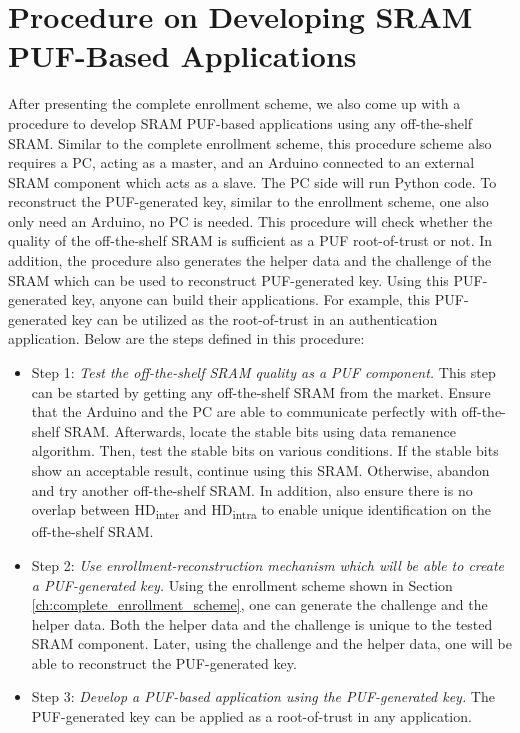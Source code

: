 \section{Procedure on Developing SRAM PUF-Based Applications}\label{ch:procedure_develop}
After presenting the complete enrollment scheme, we also come up with a procedure to develop SRAM PUF-based applications using any off-the-shelf SRAM.
Similar to the complete enrollment scheme, this procedure scheme also requires a PC, acting as a master, and an Arduino connected to an external SRAM component which acts as a slave. The PC side will run Python code. To reconstruct the PUF-generated key, similar to the enrollment scheme, one also only need an Arduino, no PC is needed.
This procedure will check whether the quality of the off-the-shelf SRAM is sufficient as a PUF root-of-trust or not. In addition, the procedure also generates the helper data and the challenge of the SRAM which can be used to reconstruct PUF-generated key. Using this PUF-generated key, anyone can build their applications. For example, this PUF-generated key can be utilized as the root-of-trust in an authentication application. Below are the steps defined in this procedure:
\begin{itemize}
  \item Step 1: \textit{Test the off-the-shelf SRAM quality as a PUF component.}\newline
  This step can be started by getting any off-the-shelf SRAM from the market. Ensure that the Arduino and the PC are able to communicate perfectly with off-the-shelf SRAM. Afterwards, locate the stable bits using data remanence algorithm. Then, test the stable bits on various conditions. If the stable bits show an acceptable result, continue using this SRAM. Otherwise, abandon and try another off-the-shelf SRAM. In addition, also ensure there is no overlap between HD\textsubscript{inter} and HD\textsubscript{intra} to enable unique identification on the off-the-shelf SRAM.
  \item Step 2: \textit{Use enrollment-reconstruction mechanism which will be able to create a PUF-generated key.}\newline
  Using the enrollment scheme shown in Section \ref{ch:complete_enrollment_scheme}, one can generate the challenge and the helper data. Both the helper data and the challenge is unique to the tested SRAM component. Later, using the challenge and the helper data, one will be able to reconstruct the PUF-generated key.
  \item Step 3: \textit{Develop a PUF-based application using the PUF-generated key.}\newline
  The PUF-generated key can be applied as a root-of-trust in any application.
\end{itemize}

